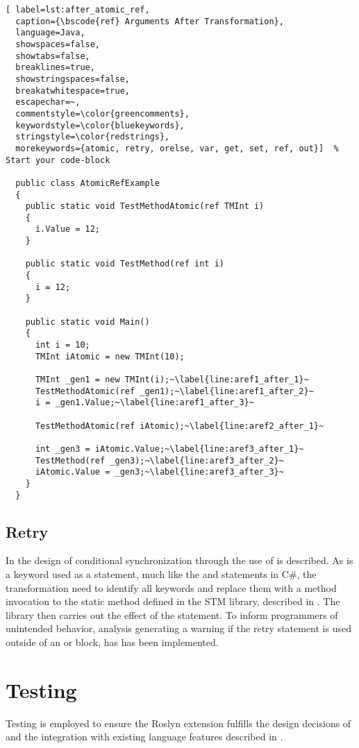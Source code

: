 \begin{lstlisting}[ label=lst:after_atomic_ref,
  caption={\bscode{ref} Arguments After Transformation},
  language=Java,  
  showspaces=false,
  showtabs=false,
  breaklines=true,
  showstringspaces=false,
  breakatwhitespace=true,
  escapechar=~,
  commentstyle=\color{greencomments},
  keywordstyle=\color{bluekeywords},
  stringstyle=\color{redstrings},
  morekeywords={atomic, retry, orelse, var, get, set, ref, out}]  % Start your code-block

  public class AtomicRefExample
  {
    public static void TestMethodAtomic(ref TMInt i)
    {
      i.Value = 12;
    }

    public static void TestMethod(ref int i)
    {
      i = 12;
    }

    public static void Main()
    {
      int i = 10;
      TMInt iAtomic = new TMInt(10);

      TMInt _gen1 = new TMInt(i);~\label{line:aref1_after_1}~
      TestMethodAtomic(ref _gen1);~\label{line:aref1_after_2}~
      i = _gen1.Value;~\label{line:aref1_after_3}~

      TestMethodAtomic(ref iAtomic);~\label{line:aref2_after_1}~

      int _gen3 = iAtomic.Value;~\label{line:aref3_after_1}~
      TestMethod(ref _gen3);~\label{line:aref3_after_2}~
      iAtomic.Value = _gen3;~\label{line:aref3_after_3}~
    }
  }
\end{lstlisting}


\subsection{Retry}
In  the design of conditional synchronization through the use of  is described. As  is a keyword used as a statement, much like the  and  statements in C\#, the transformation need to identify all  keywords and replace them with a method invocation to the static method  defined in the \ac{STM} library, described in . The library then carries out the effect of the  statement. To inform programmers of unintended behavior, analysis generating a warning if the retry statement is used outside of an  or  block, has has been implemented. 

\section{Testing}
Testing is employed to ensure the Roslyn extension fulfills the design decisions of \stmnamesp and the integration with existing language features described in .

